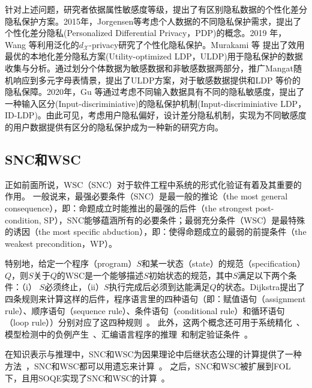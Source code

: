 针对上述问题，研究者依据属性敏感度等级，提出了有区别隐私数据的个性化差分隐私保护方案\cite{chen2016private}。2015年，Jorgensen等\cite{jorgensen2015conservative}考虑个人数据的不同隐私保护需求，提出了个性化差分隐私(Personalized Differential Privacy，PDP)的概念。2019 年，Wang 等\cite{wang2019personalized}利用泛化的$d_{\mathcal{X}}$-privacy\cite{chatzikokolakis2013broadening}研究了个性化隐私保护。Murakami 等\cite{murakami2019utility} 提出了效用最优的本地化差分隐私方案(Utility-optimized LDP，ULDP)用于隐私保护的数据收集与分析。通过划分个体数据为敏感数据和非敏感数据两部分，推广Mangat\cite{mangat1994an}随机响应到多元字母表情景，提出了ULDP方案，对于敏感数据提供和LDP 等价的隐私保障。2020年，Gu 等\cite{gu2020providing}通过考虑不同输入数据具有不同的隐私敏感度，提出了一种输入区分(Input-discriminiative)的隐私保护机制(Input-discriminiative LDP，ID-LDP)。由此可见，考虑用户隐私偏好，设计差分隐私机制，实现为不同敏感度的用户数据提供有区分的隐私保护成为一种新的研究方向。


\subsection{SNC和WSC}


正如前面所说，WSC（SNC）对于软件工程中系统的形式化验证有着及其重要的作用。
一般说来，最强必要条件（SNC）是最一般的推论（the most general consequence），即：命题成立时能推出的最强的后件（the strongest post-condition, SP），SNC能够蕴涵所有的必要条件；最弱充分条件（WSC）是最特殊的诱因（the most specific abduction），即：使得命题成立的最弱的前提条件（the weakest precondition，WP）。

特别地，给定一个程序（program）$S$和某一状态（state）的规范（specification）$Q$，则$S$关于$Q$的WSC是一个能够描述$S$初始状态的规范，其中$S$满足以下两个条件：（i） $S$必须终止，（ii）$S$执行完成后必须到达能满足$Q$的状态。Dijkstra提出了四条规则来计算这样的后件，程序语言里的四种语句（即：赋值语句（assignment rule）、顺序语句（sequence rule）、条件语句（conditional rule）和循环语句（loop rule））分别对应了这四种规则~\cite{DBLP:journals/cacm/Dijkstra75}。
此外，这两个概念还可用于系统精化~\cite{woodcock1990refinement}、模型检测中的负例产生~\cite{dailler2018instrumenting}、汇编语言程序的推理~\cite{legato2002weakest}和制定验证条件~\cite{DBLP:journals/ipl/Leino05}。


在知识表示与推理中，SNC和WSC为因果理论中后继状态公理的计算提供了一种方法~\cite{lin2003compiling}，SNC和WSC都可以用遗忘来计算~\cite{DBLP:Lin:AIJ:2001,DBLP:conf/ijcai/DohertyLS01}。
之后，SNC和WSC被扩展到FOL下，且用SOQE实现了SNC和WSC的计算~\cite{DBLP:conf/ijcai/DohertyLS01}。

